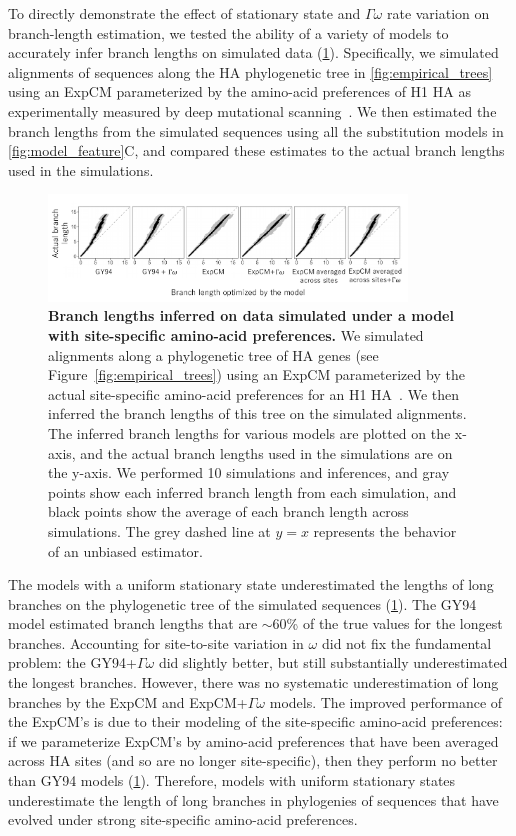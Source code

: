 \documentclass[11pt]{article}
\begin{document}
To directly demonstrate the effect of stationary state and $\Gamma\omega$ rate variation on branch-length estimation, we tested the ability of a variety of models to accurately infer branch lengths on simulated data (\ref{fig:simulations}).
Specifically, we simulated alignments of sequences along the HA phylogenetic tree in \ref{fig:empirical_trees} using an ExpCM parameterized by the amino-acid preferences of H1 HA as experimentally measured by deep mutational scanning~\citep{doud2016accurate}. We then estimated the branch lengths from the simulated sequences using all the substitution models in \ref{fig:model_feature}C, and compared these estimates to the actual branch lengths used in the simulations.

\begin{figure}
\centerline{\includegraphics[width=0.85\textwidth]{figures/simulations}}
\caption{\label{fig:simulations}
\textbf{Branch lengths inferred on data simulated under a model with site-specific amino-acid preferences.} 
We simulated alignments along a phylogenetic tree of HA genes (see Figure~\ref{fig:empirical_trees}) using an ExpCM parameterized by the actual site-specific amino-acid preferences for an H1 HA~\citep{doud2016accurate}.
We then inferred the branch lengths of this tree on the simulated alignments.
The inferred branch lengths for various models are plotted on the x-axis, and the actual branch lengths used in the simulations are on the y-axis.
We performed 10 simulations and inferences, and gray points show each inferred branch length from each simulation, and black points show the average of each branch length across simulations.
The grey dashed line at $y=x$ represents the behavior of an unbiased estimator. 
}
\end{figure}

The models with a uniform stationary state underestimated the lengths of long branches on the phylogenetic tree of the simulated sequences (\ref{fig:simulations}). 
The GY94 model estimated branch lengths that are $\sim$60\% of the true values for the longest branches. 
Accounting for site-to-site variation in $\omega$ did not fix the fundamental problem: the GY94+$\Gamma\omega$ did slightly better, but still substantially underestimated the longest branches.
However, there was no systematic underestimation of long branches by the ExpCM and ExpCM+$\Gamma\omega$ models.
The improved performance of the ExpCM's is due to their modeling of the site-specific amino-acid preferences: if we parameterize ExpCM's by amino-acid preferences that have been averaged across HA sites (and so are no longer site-specific), then they perform no better than GY94 models (\ref{fig:simulations}).
Therefore, models with uniform stationary states underestimate the length of long branches in phylogenies of sequences that have evolved under strong site-specific amino-acid preferences.
\end{document}
